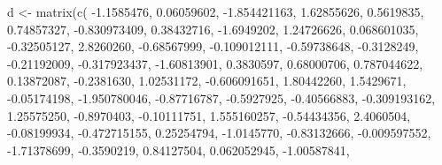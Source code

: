 \documentclass[
  12pt,
  krantz2]{krantz}
\makeatletter
\newenvironment{Shaded}{\begin{snugshade}}{\end{snugshade}}
\newcommand{\FloatTok}[1]{\textcolor[rgb]{0.06,0.06,0.06}{#1}}
\newcommand{\FunctionTok}[1]{\textcolor[rgb]{0,0,0}{#1}}
\newcommand{\NormalTok}[1]{#1}
\newcommand{\OtherTok}[1]{\textcolor[rgb]{0.37,0.37,0.37}{#1}}
\newcommand{\SpecialCharTok}[1]{\textcolor[rgb]{0,0,0}{#1}}
\newenvironment{kframe}{%
\medskip{}
\setlength{\fboxsep}{.8em}
 \def\at@end@of@kframe{}%
 \ifinner\ifhmode%
  \def\at@end@of@kframe{\end{minipage}}%
  \begin{minipage}{\columnwidth}%
 \fi\fi%
 \def\FrameCommand##1{\hskip\@totalleftmargin \hskip-\fboxsep
 \colorbox{shadecolor}{##1}\hskip-\fboxsep
     \hskip-\linewidth \hskip-\@totalleftmargin \hskip\columnwidth}%
 \MakeFramed {\advance\hsize-\width
   \@totalleftmargin\z@ \linewidth\hsize
   \@setminipage}}%
 {\par\unskip\endMakeFramed%
 \at@end@of@kframe}
\renewenvironment{Shaded}{\begin{kframe}}{\end{kframe}}
\makeatother
\begin{document}
\begin{Shaded}
\begin{Highlighting}[]
\NormalTok{d }\OtherTok{\textless{}{-}} \FunctionTok{matrix}\NormalTok{(}\FunctionTok{c}\NormalTok{(}
  \SpecialCharTok{{-}}\FloatTok{1.1585476}\NormalTok{,  }\FloatTok{0.06059602}\NormalTok{, }\SpecialCharTok{{-}}\FloatTok{1.854421163}\NormalTok{,  }\FloatTok{1.62855626}\NormalTok{,}
  \FloatTok{0.5619835}\NormalTok{,  }\FloatTok{0.74857327}\NormalTok{, }\SpecialCharTok{{-}}\FloatTok{0.830973409}\NormalTok{,  }\FloatTok{0.38432716}\NormalTok{,}
  \SpecialCharTok{{-}}\FloatTok{1.6949202}\NormalTok{,  }\FloatTok{1.24726626}\NormalTok{,  }\FloatTok{0.068601035}\NormalTok{, }\SpecialCharTok{{-}}\FloatTok{0.32505127}\NormalTok{,}
  \FloatTok{2.8260260}\NormalTok{, }\SpecialCharTok{{-}}\FloatTok{0.68567999}\NormalTok{, }\SpecialCharTok{{-}}\FloatTok{0.109012111}\NormalTok{, }\SpecialCharTok{{-}}\FloatTok{0.59738648}\NormalTok{,}
  \SpecialCharTok{{-}}\FloatTok{0.3128249}\NormalTok{, }\SpecialCharTok{{-}}\FloatTok{0.21192009}\NormalTok{, }\SpecialCharTok{{-}}\FloatTok{0.317923437}\NormalTok{, }\SpecialCharTok{{-}}\FloatTok{1.60813901}\NormalTok{,}
  \FloatTok{0.3830597}\NormalTok{,  }\FloatTok{0.68000706}\NormalTok{,  }\FloatTok{0.787044622}\NormalTok{,  }\FloatTok{0.13872087}\NormalTok{,}
  \SpecialCharTok{{-}}\FloatTok{0.2381630}\NormalTok{,  }\FloatTok{1.02531172}\NormalTok{, }\SpecialCharTok{{-}}\FloatTok{0.606091651}\NormalTok{,  }\FloatTok{1.80442260}\NormalTok{,}
  \FloatTok{1.5429671}\NormalTok{, }\SpecialCharTok{{-}}\FloatTok{0.05174198}\NormalTok{, }\SpecialCharTok{{-}}\FloatTok{1.950780046}\NormalTok{, }\SpecialCharTok{{-}}\FloatTok{0.87716787}\NormalTok{,}
  \SpecialCharTok{{-}}\FloatTok{0.5927925}\NormalTok{, }\SpecialCharTok{{-}}\FloatTok{0.40566883}\NormalTok{, }\SpecialCharTok{{-}}\FloatTok{0.309193162}\NormalTok{,  }\FloatTok{1.25575250}\NormalTok{,}
  \SpecialCharTok{{-}}\FloatTok{0.8970403}\NormalTok{, }\SpecialCharTok{{-}}\FloatTok{0.10111751}\NormalTok{,  }\FloatTok{1.555160257}\NormalTok{, }\SpecialCharTok{{-}}\FloatTok{0.54434356}\NormalTok{,}
  \FloatTok{2.4060504}\NormalTok{, }\SpecialCharTok{{-}}\FloatTok{0.08199934}\NormalTok{, }\SpecialCharTok{{-}}\FloatTok{0.472715155}\NormalTok{,  }\FloatTok{0.25254794}\NormalTok{,}
  \SpecialCharTok{{-}}\FloatTok{1.0145770}\NormalTok{, }\SpecialCharTok{{-}}\FloatTok{0.83132666}\NormalTok{, }\SpecialCharTok{{-}}\FloatTok{0.009597552}\NormalTok{, }\SpecialCharTok{{-}}\FloatTok{1.71378699}\NormalTok{,}
  \SpecialCharTok{{-}}\FloatTok{0.3590219}\NormalTok{,  }\FloatTok{0.84127504}\NormalTok{,  }\FloatTok{0.062052945}\NormalTok{, }\SpecialCharTok{{-}}\FloatTok{1.00587841}\NormalTok{,}

\end{Highlighting}
\end{Shaded}
\end{document}
